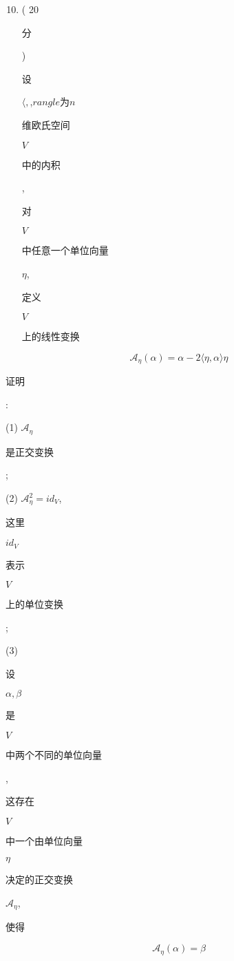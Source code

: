 \documentclass[10pt]{article}
\begin{document}
\begin{enumerate}
  \setcounter{enumi}{9}
  \item ( 20 \begin{CJK}{UTF8}{mj}分\end{CJK}) \begin{CJK}{UTF8}{mj}设\end{CJK} $\langle,$,$rangle 为 n$ \begin{CJK}{UTF8}{mj}维欧氏空间\end{CJK} $V$ \begin{CJK}{UTF8}{mj}中的内积\end{CJK}, \begin{CJK}{UTF8}{mj}对\end{CJK} $V$ \begin{CJK}{UTF8}{mj}中任意一个单位向量\end{CJK} $\eta$, \begin{CJK}{UTF8}{mj}定义\end{CJK} $V$ \begin{CJK}{UTF8}{mj}上的线性变换\end{CJK}
\end{enumerate}
$$
\mathcal{A}_{\eta}(\alpha)=\alpha-2\langle\eta, \alpha\rangle \eta
$$
\begin{CJK}{UTF8}{mj}证明\end{CJK}:

(1) $\mathcal{A}_{\eta}$ \begin{CJK}{UTF8}{mj}是正交变换\end{CJK};

(2) $\mathcal{A}_{\eta}^{2}=i d_{V}$, \begin{CJK}{UTF8}{mj}这里\end{CJK} $i d_{V}$ \begin{CJK}{UTF8}{mj}表示\end{CJK} $V$ \begin{CJK}{UTF8}{mj}上的单位变换\end{CJK};

(3) \begin{CJK}{UTF8}{mj}设\end{CJK} $\alpha, \beta$ \begin{CJK}{UTF8}{mj}是\end{CJK} $V$ \begin{CJK}{UTF8}{mj}中两个不同的单位向量\end{CJK}, \begin{CJK}{UTF8}{mj}这存在\end{CJK} $V$ \begin{CJK}{UTF8}{mj}中一个由单位向量\end{CJK} $\eta$ \begin{CJK}{UTF8}{mj}决定的正交变换\end{CJK} $\mathcal{A}_{\eta}$, \begin{CJK}{UTF8}{mj}使得\end{CJK}
$$
\mathcal{A}_{\eta}(\alpha)=\beta
$$
\end{document}
